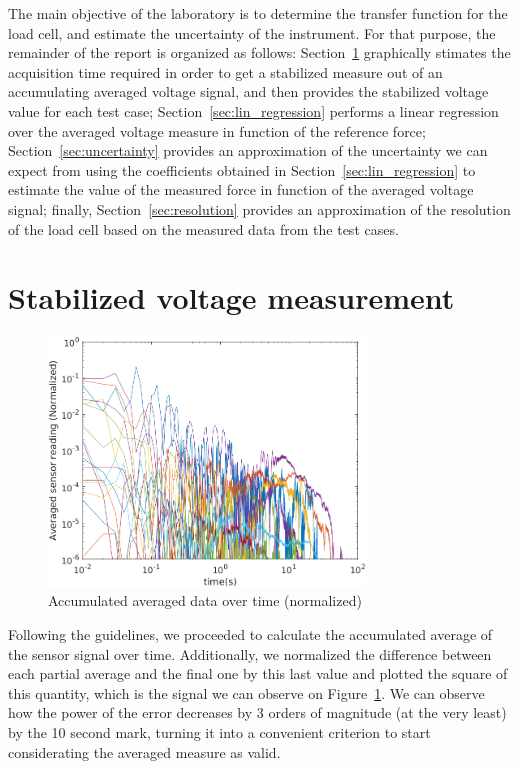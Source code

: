 \documentclass[12pt]{article}
\begin{document}
        The main objective of the laboratory is to determine the transfer function for the load cell, and estimate the uncertainty of the instrument. For that purpose, the remainder of the report is organized as follows: Section~\ref{sec:stabilized_signal} graphically stimates the acquisition time required in order to get a stabilized measure out of an accumulating averaged voltage signal, and then provides the stabilized voltage value for each test case; Section~\ref{sec:lin_regression} performs a linear regression over the averaged voltage measure in function of the reference force; Section~\ref{sec:uncertainty} provides an approximation of the uncertainty we can expect from using the coefficients obtained in Section~\ref{sec:lin_regression} to estimate the value of the measured force in function of the averaged voltage signal; finally, Section~\ref{sec:resolution} provides an approximation of the resolution of the load cell based on the measured data from the test cases.

\section{Stabilized voltage measurement} \label{sec:stabilized_signal}

        \begin{figure}[!ht]
                \includegraphics[width=0.75\textwidth]{Averaged_Data.png}
                \centering
                \caption{Accumulated averaged data over time (normalized)}
                \label{fig:averaged}
        \end{figure}

        Following the guidelines, we proceeded to calculate the accumulated average of the sensor signal over time. Additionally, we normalized the difference between each partial average and the final one by this last value and plotted the square of this quantity, which is the signal we can observe on Figure~\ref{fig:averaged}. We can observe how the power of the error decreases by 3 orders of magnitude (at the very least) by the 10 second mark, turning it into a convenient criterion to start considerating the averaged measure as valid.
\end{document}
